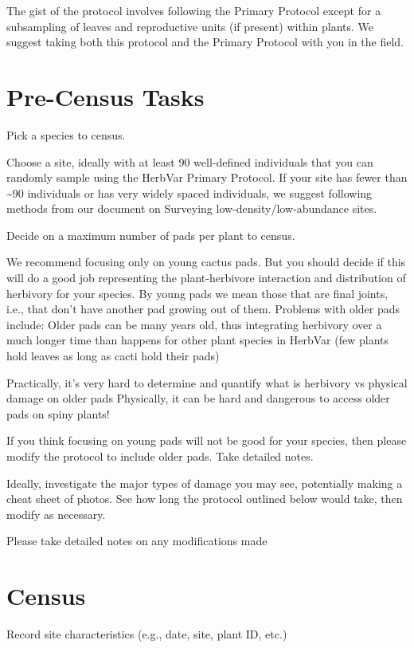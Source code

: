 \documentclass[
  letterpaper,
  DIV=11,
  numbers=noendperiod]{scrreprt}
\begin{document}
The gist of the protocol involves following the Primary Protocol except
for a subsampling of leaves and reproductive units (if present) within
plants. We suggest taking both this protocol and the Primary Protocol
with you in the field.

\section{Pre-Census Tasks}\label{pre-census-tasks}

Pick a species to census.

Choose a site, ideally with at least 90 well-defined individuals that
you can randomly sample using the HerbVar Primary Protocol. If your site
has fewer than \textasciitilde90 individuals or has very widely spaced
individuals, we suggest following methods from our document on Surveying
low-density/low-abundance sites.

Decide on a maximum number of pads per plant to census.

We recommend focusing only on young cactus pads. But you should decide
if this will do a good job representing the plant-herbivore interaction
and distribution of herbivory for your species. By young pads we mean
those that are final joints, i.e., that don't have another pad growing
out of them. Problems with older pads include: Older pads can be many
years old, thus integrating herbivory over a much longer time than
happens for other plant species in HerbVar (few plants hold leaves as
long as cacti hold their pads)

Practically, it's very hard to determine and quantify what is herbivory
vs physical damage on older pads Physically, it can be hard and
dangerous to access older pads on spiny plants!

If you think focusing on young pads will not be good for your species,
then please modify the protocol to include older pads. Take detailed
notes.

Ideally, investigate the major types of damage you may see, potentially
making a cheat sheet of photos. See how long the protocol outlined below
would take, then modify as necessary.

Please take detailed notes on any modifications made

\section{Census}\label{census}

Record site characteristics (e.g., date, site, plant ID, etc.)
\end{document}
